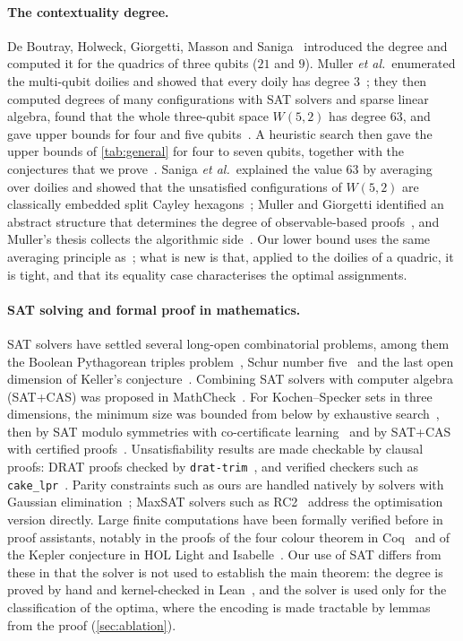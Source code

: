 \documentclass[11pt]{article}
\theoremstyle{definition}
\theoremstyle{remark}
\begin{document}
\paragraph{The contextuality degree.}
De Boutray, Holweck, Giorgetti, Masson and Saniga~\cite{deBoutray22} introduced the degree and computed it for the quadrics of three qubits ($21$ and $9$).
Muller \emph{et al.}\ enumerated the multi-qubit doilies and showed that every doily has degree $3$~\cite{Muller22doilies}; they then computed degrees of many configurations with SAT solvers and sparse linear algebra, found that the whole three-qubit space $W(5,2)$ has degree $63$, and gave upper bounds for four and five qubits~\cite{Muller23}.
A heuristic search then gave the upper bounds of \cref{tab:general} for four to seven qubits, together with the conjectures that we prove~\cite{Muller24}.
Saniga \emph{et al.}\ explained the value $63$ by averaging over doilies and showed that the unsatisfied configurations of $W(5,2)$ are classically embedded split Cayley hexagons~\cite{Saniga24hex,Holweck22hex}; Muller and Giorgetti identified an abstract structure that determines the degree of observable-based proofs~\cite{MullerGiorgetti24}, and Muller's thesis collects the algorithmic side~\cite{MullerThesis}.
Our lower bound uses the same averaging principle as~\cite{Saniga24hex,Muller24}; what is new is that, applied to the doilies of a quadric, it is tight, and that its equality case characterises the optimal assignments.

\paragraph{SAT solving and formal proof in mathematics.}
SAT solvers have settled several long-open combinatorial problems, among them the Boolean Pythagorean triples problem~\cite{Heule16}, Schur number five~\cite{Heule18} and the last open dimension of Keller's conjecture~\cite{Brakensiek20}.
Combining SAT solvers with computer algebra (SAT+CAS) was proposed in MathCheck~\cite{Zulkoski15}.
For Kochen--Specker sets in three dimensions, the minimum size was bounded from below by exhaustive search~\cite{Uijlen16}, then by SAT modulo symmetries with co-certificate learning~\cite{Kirchweger23} and by SAT+CAS with certified proofs~\cite{LiBrightGanesh24}.
Unsatisfiability results are made checkable by clausal proofs: DRAT proofs checked by \texttt{drat-trim}~\cite{DRATtrim}, and verified checkers such as \texttt{cake\_lpr}~\cite{cakeLPR}.
Parity constraints such as ours are handled natively by solvers with Gaussian elimination~\cite{Soos09}; MaxSAT solvers such as RC2~\cite{RC2} address the optimisation version directly.
Large finite computations have been formally verified before in proof assistants, notably in the proofs of the four colour theorem in Coq~\cite{Gonthier08} and of the Kepler conjecture in HOL Light and Isabelle~\cite{Hales17}.
Our use of SAT differs from these in that the solver is not used to establish the main theorem: the degree is proved by hand and kernel-checked in Lean~\cite{Lean4,Mathlib}, and the solver is used only for the classification of the optima, where the encoding is made tractable by lemmas from the proof (\cref{sec:ablation}).
\end{document}
